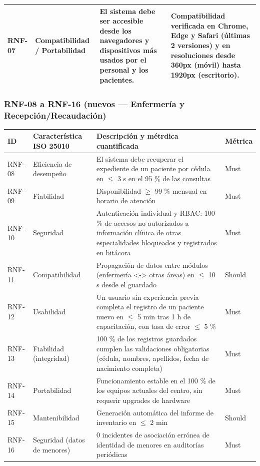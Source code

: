 \documentclass[11pt,a4paper]{article}
\begin{document}
\begin{longtable}{
			p{}
			p{}
			p{}
			p{}
		}
		RNF-07 &
		Compatibilidad / Portabilidad &
		El sistema debe ser accesible desde los navegadores y dispositivos más usados por el personal y los pacientes. &
		Compatibilidad verificada en Chrome, Edge y Safari (últimas 2 versiones) y en resoluciones desde 360px (móvil) hasta 1920px (escritorio). \\
		
		\bottomrule
		
	\end{longtable}
	
	\subsubsection{ RNF-08 a RNF-16 (nuevos --- Enfermería y Recepción/Recaudación)}
	
	\begin{longtable}{p{}
			p{}
			p{}
			p{}}
		
		\toprule
		\textbf{ID} &
		\textbf{Característica ISO 25010} &
		\textbf{Descripción y métrdica cuantificada} &
		\textbf{Métrica}  \\
		\midrule
		\endhead
		
		RNF-08 & Eficiencia de desempeño & El sistema debe recuperar el expediente de un paciente por cédula en \(\leq\) 3 s en el 95 \% de las consultas & Must \\
		RNF-09 & Fiabilidad & Disponibilidad \(\geq\) 99 \% mensual en horario de atención & Must \\
		RNF-10 & Seguridad & Autenticación individual y RBAC: 100 \% de accesos no autorizados a información clínica de otras especialidades bloqueados y registrados en bitácora & Must \\
		RNF-11 & Compatibilidad & Propagación de datos entre módulos (enfermería <-> otras áreas) en \(\leq\) 10 s desde el guardado & Should \\
		RNF-12 & Usabilidad & Un usuario sin experiencia previa completa el registro de un paciente nuevo en \(\leq\) 5 min tras 1 h de capacitación, con tasa de error \(\leq\) 5 \% & Must \\
		RNF-13 & Fiabilidad (integridad) & 100 \% de los registros guardados cumplen las validaciones obligatorias (cédula, nombres, apellidos, fecha de nacimiento completa) & Must \\
		RNF-14 & Portabilidad & Funcionamiento estable en el 100 \% de los equipos actuales del centro, sin requerir upgrades de hardware & Must \\
		RNF-15 & Mantenibilidad & Generación automática del informe de inventario en \(\leq\) 2 min & Should \\
		RNF-16 & Seguridad (datos de menores) & 0 incidentes de asociación errónea de identidad de menores en auditorías periódicas & Must \\
		\bottomrule
		
	\end{longtable}
	
\end{document}
